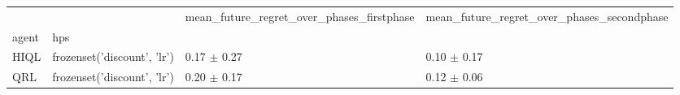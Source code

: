 \begin{tabular}{llll}
\toprule
 &  & mean_future_regret_over_phases_firstphase & mean_future_regret_over_phases_secondphase \\
agent & hps &  &  \\
\midrule
HIQL & frozenset({'discount', 'lr'}) & 0.17 $\pm$ 0.27 & 0.10 $\pm$ 0.17 \\
\cline{1-4}
QRL & frozenset({'discount', 'lr'}) & 0.20 $\pm$ 0.17 & 0.12 $\pm$ 0.06 \\
\cline{1-4}
\bottomrule
\end{tabular}
